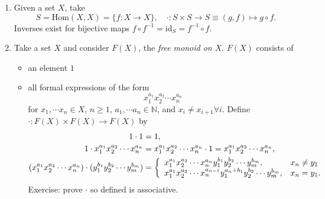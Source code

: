 \documentclass{article}
\begin{document}
\begin{xmpl}
  \begin{enumerate}
    \item{Given a set $X$, take
          $$
          S = \mathrm{Hom}(X, X) = \{f : X \to X\}, \quad
          \cdot : S \times S \to S \equiv (g, f) \mapsto g \circ f.
          $$
          Inverses exist for bijective maps 
          $f \circ f^{-1} = \mathrm{id}_S = f^{-1} \circ f$.
         }
    \item{Take a set $X$ and consider $F(X)$, the \emph{free monoid on $X$}.
          $F(X)$ consists of
          \begin{itemize}
            \item{an element $1$}
            \item{all formal expressions of the form
                  $$
                  x_1^{a_1} x_2^{a_2} \cdots x_n^{a_n}
                  $$
                  for $x_1, \cdots x_n \in X$, $n \geq 1$, 
                  $a_1, \cdots a_n \in \mathbb{N}$, and 
                  $x_i \neq x_{i+1} \forall i$.
                  Define $\cdot : F(X) \times F(X) \to F(X)$ by
                  \begin{align*}
                    1 \cdot 1 &= 1, \\
                    1 \cdot x_1^{a_1} x_2^{a_2} \cdots x_n^{a_n} 
                    & = x_1^{a_1} x_2^{a_2} \cdots x_n^{a_n} \cdot 1
                      = x_1^{a_1} x_2^{a_2} \cdots x_n^{a_n}, \\                    
                    (x_1^{a_1} x_2^{a_2} \cdots x_n^{a_n}) \cdot
                    (y_1^{b_1} y_2^{b_2} \cdots y_m^{b_m})
                    & = \left\{
                          \begin{array}{l l}
                            x_1^{a_1} x_2^{a_2} \cdots x_n^{a_n} 
                            y_1^{b_1} y_2^{b_2} \cdots y_m^{b_m},      & x_n \neq y_1 \\
                            x_1^{a_1} x_2^{a_2} \cdots x_n^{a_{n-1}} 
                            y_1^{a_n + b_1} y_2^{b_2} \cdots y_m^{b_m}, & x_n = y_1.
                          \end{array} 
                        \right.
                  \end{align*}
                  Exercise: prove $\cdot$ so defined is associative.
                }
          \end{itemize}
         }
  \end{enumerate}
\end{xmpl}
\end{document}
